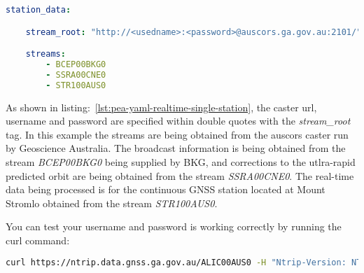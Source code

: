 
\begin{lstlisting}[language=yaml,caption=yaml input files configuration example]
station_data:

	stream_root: "http://<usedname>:<password>@auscors.ga.gov.au:2101/"

	streams:
		- BCEP00BKG0
		- SSRA00CNE0
		- STR100AUS0
\end{lstlisting}
%
As shown in listing:~\ref{lst:pea-yaml-realtime-single-station}, the caster url, username and password are specified within double quotes with the \emph{stream\_root} tag. In this example the streams are being obtained from the auscors caster run by Geoscience Australia. 
The broadcast information is being obtained from the stream \emph{BCEP00BKG0} being supplied by BKG, and corrections to the utlra-rapid predicted orbit are being obtained from the stream \emph{SSRA00CNE0}. 
The real-time data being processed is for the continuous GNSS station located at Mount Stromlo obtained from the stream \emph{STR100AUS0}.

You can test your username and password is working correctly by running the curl command:
\begin{lstlisting}[language=bash]
curl https://ntrip.data.gnss.ga.gov.au/ALIC00AUS0 -H "Ntrip-Version: NTRIP/2.0" -i  --output - -u <user>
\end{lstlisting}
%
